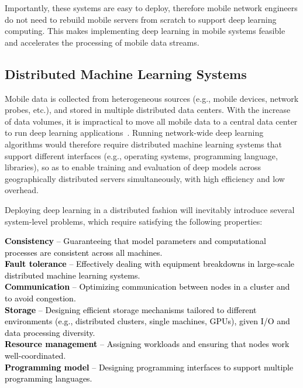 \documentclass[journal,comsoc,letter]{IEEEtran}
\newcommand{\edit}[1]{\textcolor{black}{#1}}
\begin{document}
Importantly, these systems are easy to deploy, therefore mobile network engineers do not need to rebuild mobile servers from scratch to support deep learning computing. This makes implementing deep learning in mobile systems feasible and accelerates the processing of mobile data streams.

\vspace*{-0.5em}
\subsection{Distributed Machine Learning Systems}
Mobile data is collected from heterogeneous sources (e.g., mobile devices, network probes, etc.), and stored in multiple distributed data centers. With the increase of data volumes, it is impractical to move all mobile data to a central data center to run deep learning applications~\cite{hsieh2017gaia}. Running network-wide deep learning algorithms would therefore require distributed machine learning systems that support different interfaces (e.g., operating systems, programming language, libraries), so as to enable training and evaluation of deep models across geographically distributed servers simultaneously, with high efficiency and low overhead.

Deploying deep learning in a distributed fashion will inevitably introduce several system-level problems, which \mbox{require} satisfying the following properties:

\noindent\edit{
\textbf{Consistency} -- Guaranteeing that model parameters and computational processes are consistent across all  machines.\\
\textbf{Fault tolerance} -- Effectively dealing with equipment breakdowns in large-scale distributed machine learning systems.\\
\textbf{Communication} -- Optimizing communication between nodes in a cluster and  to avoid congestion.\\
\textbf{Storage} -- Designing efficient storage mechanisms tailored to different environments (e.g., distributed clusters, single machines, GPUs), given I/O and data processing diversity.\\
\textbf{Resource management} --  Assigning workloads and ensuring that nodes work well-coordinated.\\
\textbf{Programming model} -- Designing programming interfaces to support multiple programming languages.
\vspace*{0.5em}
}
\end{document}
